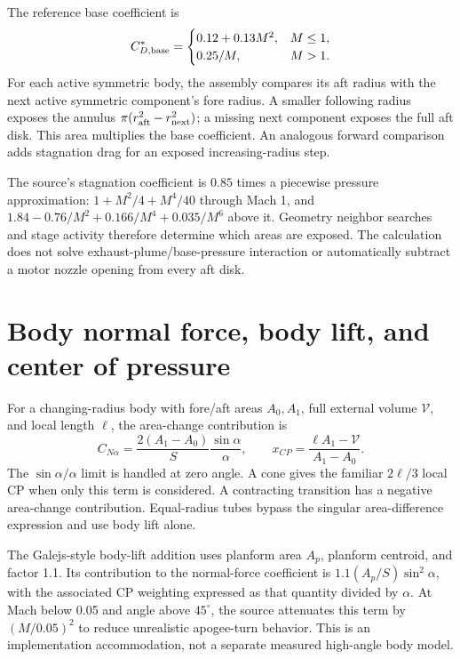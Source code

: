 The reference base coefficient is
\begin{equation}
C_{D,\rm base}^{*}=\begin{cases}0.12+0.13M^2,&M\leq1,\\0.25/M,&M>1.\end{cases}
\end{equation}
For each active symmetric body, the assembly compares its aft radius with the next active symmetric component's fore radius. A smaller following radius exposes the annulus $\pi(r_{\rm aft}^2-r_{\rm next}^2)$; a missing next component exposes the full aft disk. This area multiplies the base coefficient. An analogous forward comparison adds stagnation drag for an exposed increasing-radius step.

The source's stagnation coefficient is $0.85$ times a piecewise pressure approximation: $1+M^2/4+M^4/40$ through Mach 1, and $1.84-0.76/M^2+0.166/M^4+0.035/M^6$ above it. Geometry neighbor searches and stage activity therefore determine which areas are exposed. The calculation does not solve exhaust-plume/base-pressure interaction or automatically subtract a motor nozzle opening from every aft disk.


\section{Body normal force, body lift, and center of pressure}
For a changing-radius body with fore/aft areas $A_0,A_1$, full external volume $\mathcal V$, and local length $\ell$, the area-change contribution is
\begin{equation}
C_{N\alpha}=\frac{2(A_1-A_0)}{S}\frac{\sin\alpha}{\alpha},
\qquad x_{CP}=\frac{\ell A_1-\mathcal V}{A_1-A_0}.
\end{equation}
The $\sin\alpha/\alpha$ limit is handled at zero angle. A cone gives the familiar $2\ell/3$ local CP when only this term is considered. A contracting transition has a negative area-change contribution. Equal-radius tubes bypass the singular area-difference expression and use body lift alone.

The Galejs-style body-lift addition uses planform area $A_p$, planform centroid, and factor 1.1. Its contribution to the normal-force coefficient is $1.1(A_p/S)\sin^2\alpha$, with the associated CP weighting expressed as that quantity divided by $\alpha$. At Mach below 0.05 and angle above $45^\circ$, the source attenuates this term by $(M/0.05)^2$ to reduce unrealistic apogee-turn behavior. This is an implementation accommodation, not a separate measured high-angle body model.

